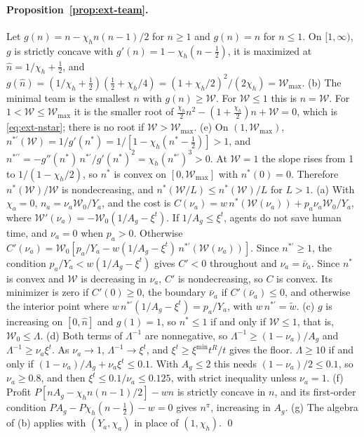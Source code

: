 \paragraph{Proposition~\ref{prop:ext-team}.} Let $g(n)=n-\chi_hn(n-1)/2$ for $n\ge1$ and $g(n)=n$ for $n\le1$. On $[1,\infty)$, $g$ is strictly concave with $g'(n)=1-\chi_h(n-\tfrac12)$, it is maximized at $\hat n=1/\chi_h+\tfrac12$, and $g(\hat n)=(1/\chi_h+\tfrac12)(\tfrac12+\chi_h/4)=(1+\chi_h/2)^2/(2\chi_h)=\mathcal W_{\max}$.
(b) The minimal team is the smallest $n$ with $g(n)\ge \mathcal W$. For $\mathcal W\le1$ this is $n=\mathcal W$. For $1<\mathcal W\le \mathcal W_{\max}$ it is the smaller root of $\tfrac{\chi_h}2n^2-(1+\tfrac{\chi_h}2)n+\mathcal W=0$, which is \eqref{eq:ext-nstar}; there is no root if $\mathcal W>\mathcal W_{\max}$.
(e) On $(1,\mathcal W_{\max})$, $n^{*\prime}(\mathcal W)=1/g'(n^*)=1/[1-\chi_h(n^*-\tfrac12)]>1$, and $n^{*\prime\prime}=-g''(n^*)\,n^{*\prime}/g'(n^*)^2=\chi_h(n^{*\prime})^3>0$. At $\mathcal W=1$ the slope rises from 1 to $1/(1-\chi_h/2)$, so $n^*$ is convex on $[0,\mathcal W_{\max}]$ with $n^*(0)=0$. Therefore $n^*(\mathcal W)/\mathcal W$ is nondecreasing, and $n^*(\mathcal W/L)\le n^*(\mathcal W)/L$ for $L>1$.
(a) With $\chi_a=0$, $n_a=\nu_a\mathcal W_0/Y_a$, and the cost is $C(\nu_a)=w\,n^*(\mathcal W(\nu_a))+p_a\nu_a\mathcal W_0/Y_a$, where $\mathcal W'(\nu_a)=-\mathcal W_0(1/A_g-\xi^t)$. If $1/A_g\le\xi^t$, agents do not save human time, and $\nu_a=0$ when $p_a>0$. Otherwise $C'(\nu_a)=\mathcal W_0[p_a/Y_a-w(1/A_g-\xi^t)\,n^{*\prime}(\mathcal W(\nu_a))]$. Since $n^{*\prime}\ge1$, the condition $p_a/Y_a<w(1/A_g-\xi^t)$ gives $C'<0$ throughout and $\nu_a=\bar\nu_a$. Since $n^*$ is convex and $\mathcal W$ is decreasing in $\nu_a$, $C'$ is nondecreasing, so $C$ is convex. Its minimizer is zero if $C'(0)\ge0$, the boundary $\bar\nu_a$ if $C'(\bar\nu_a)\le0$, and otherwise the interior point where $w\,n^{*\prime}(1/A_g-\xi^t)=p_a/Y_a$, with $w\,n^{*\prime}=\tilde w$.
(c) $g$ is increasing on $[0,\hat n]$ and $g(1)=1$, so $n^*\le1$ if and only if $\mathcal W\le1$, that is, $\mathcal W_0\le\Lambda$.
(d) Both terms of $\Lambda^{-1}$ are nonnegative, so $\Lambda^{-1}\ge(1-\nu_a)/A_g$ and $\Lambda^{-1}\ge\nu_a\xi^t$. As $\nu_a\to1$, $\Lambda^{-1}\to\xi^t$, and $\xi^t\ge\xi^{\min}t^R/t$ gives the floor. $\Lambda\ge10$ if and only if $(1-\nu_a)/A_g+\nu_a\xi^t\le0.1$. With $A_g\le2$ this needs $(1-\nu_a)/2\le0.1$, so $\nu_a\ge0.8$, and then $\xi^t\le0.1/\nu_a\le0.125$, with strict inequality unless $\nu_a=1$.
(f) Profit $P[nA_g-\chi_hn(n-1)/2]-wn$ is strictly concave in $n$, and its first-order condition $PA_g-P\chi_h(n-\tfrac12)-w=0$ gives $n^\pi$, increasing in $A_g$.
(g) The algebra of (b) applies with $(Y_a,\chi_a)$ in place of $(1,\chi_h)$. \qed

